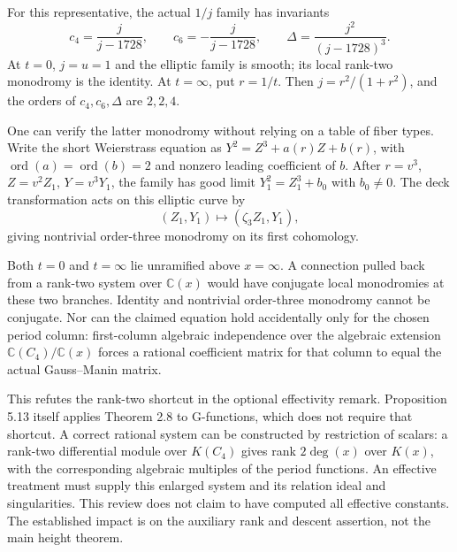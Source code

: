 \documentclass[10pt]{article}
\begin{document}
For this representative, the actual \(1/j\) family has invariants \[c_4=\frac{j}{j-1728},\qquad
 c_6=-\frac{j}{j-1728},\qquad
 \Delta=\frac{j^2}{(j-1728)^3}.\] At \(t=0\), \(j=u=1\) and the elliptic family is smooth; its local rank-two monodromy is the identity. At \(t=\infty\), put \(r=1/t\). Then \(j=r^2/(1+r^2)\), and the orders of \(c_4,c_6,\Delta\) are \(2,2,4\).\par
One can verify the latter monodromy without relying on a table of fiber types. Write the short Weierstrass equation as \(Y^2=Z^3+a(r)Z+b(r)\), with \(\operatorname{ord}(a)=
\operatorname{ord}(b)=2\) and nonzero leading coefficient of \(b\). After \(r=v^3\), \(Z=v^2Z_1\), \(Y=v^3Y_1\), the family has good limit \(Y_1^2=Z_1^3+b_0\) with \(b_0\ne0\). The deck transformation acts on this elliptic curve by \[(Z_1,Y_1)\longmapsto(\zeta_3 Z_1,Y_1),\] giving nontrivial order-three monodromy on its first cohomology.\par
Both \(t=0\) and \(t=\infty\) lie unramified above \(x=\infty\). A connection pulled back from a rank-two system over \(\mathbb C(x)\) would have conjugate local monodromies at these two branches. Identity and nontrivial order-three monodromy cannot be conjugate. Nor can the claimed equation hold accidentally only for the chosen period column: first-column algebraic independence over the algebraic extension \(\mathbb C(C_4)/\mathbb C(x)\) forces a rational coefficient matrix for that column to equal the actual Gauss–Manin matrix.\par
This refutes the rank-two shortcut in the optional effectivity remark. Proposition 5.13 itself applies Theorem 2.8 to G-functions, which does not require that shortcut. A correct rational system can be constructed by restriction of scalars: a rank-two differential module over \(K(C_4)\) gives rank \(2\deg(x)\) over \(K(x)\), with the corresponding algebraic multiples of the period functions. An effective treatment must supply this enlarged system and its relation ideal and singularities. This review does not claim to have computed all effective constants. The established impact is on the auxiliary rank and descent assertion, not the main height theorem.\par
\end{document}
